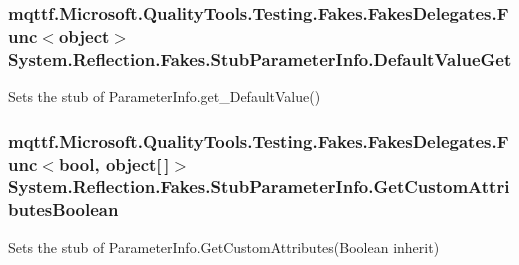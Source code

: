 \hypertarget{class_system_1_1_reflection_1_1_fakes_1_1_stub_parameter_info_abcc7475ffac6117e3dfef0226d5837c4}{
\subsubsection[{Default\-Value\-Get}]{\setlength{\rightskip}{0pt plus 5cm}mqttf.\-Microsoft.\-Quality\-Tools.\-Testing.\-Fakes.\-Fakes\-Delegates.\-Func$<$object$>$ System.\-Reflection.\-Fakes.\-Stub\-Parameter\-Info.\-Default\-Value\-Get}}\label{class_system_1_1_reflection_1_1_fakes_1_1_stub_parameter_info_abcc7475ffac6117e3dfef0226d5837c4}


Sets the stub of Parameter\-Info.\-get\-\_\-\-Default\-Value()

\hypertarget{class_system_1_1_reflection_1_1_fakes_1_1_stub_parameter_info_ac251b549e7b0d0234e7e0e2ab872f2c9}{
\subsubsection[{Get\-Custom\-Attributes\-Boolean}]{\setlength{\rightskip}{0pt plus 5cm}mqttf.\-Microsoft.\-Quality\-Tools.\-Testing.\-Fakes.\-Fakes\-Delegates.\-Func$<$bool, object\mbox{[}$\,$\mbox{]}$>$ System.\-Reflection.\-Fakes.\-Stub\-Parameter\-Info.\-Get\-Custom\-Attributes\-Boolean}}\label{class_system_1_1_reflection_1_1_fakes_1_1_stub_parameter_info_ac251b549e7b0d0234e7e0e2ab872f2c9}


Sets the stub of Parameter\-Info.\-Get\-Custom\-Attributes(\-Boolean inherit)

